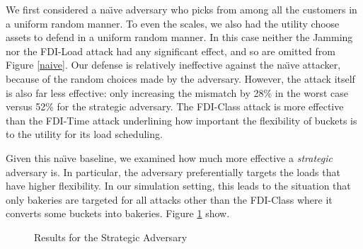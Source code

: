 We first considered a na\"\i ve adversary who picks from among all the customers in a uniform random manner. To even the scales, we also had the utility choose assets to defend in a uniform random manner. In this case neither the Jamming nor the FDI-Load attack had any significant effect, and so are omitted from Figure \ref{naive}. Our defense is relatively ineffective against the na\"\i ve attacker, because of the random choices made by the adversary. However, the attack itself is also far less effective: only increasing the mismatch by 28\% in the worst case versus 52\% for the strategic adversary. The FDI-Class attack is more effective than the FDI-Time attack underlining how important the flexibility of buckets is to the utility for its load scheduling. 

Given this na\"\i ve baseline, we examined how much more effective a \emph{strategic} adversary is. In particular, the adversary preferentially targets the loads that have higher flexibility. In our simulation setting, this leads to the situation that only bakeries are targeted for all attacks other than the FDI-Class where it converts some buckets into bakeries. Figure \ref{strategic} show.

\begin{figure}[htp]
    \centering
    \hfill
    \caption{Results for the Strategic Adversary}

    \label{strategic}  
\end{figure}

